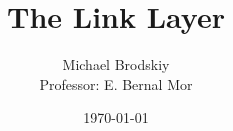 


\title{The Link Layer}
\date{\today}
\author{Michael Brodskiy\\ \small Professor: E. Bernal Mor}



\maketitle

